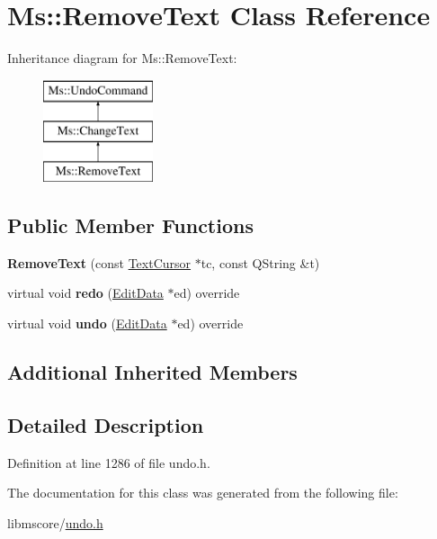 \hypertarget{class_ms_1_1_remove_text}{}\section{Ms\+:\+:Remove\+Text Class Reference}
\label{class_ms_1_1_remove_text}
Inheritance diagram for Ms\+:\+:Remove\+Text\+:\begin{figure}[H]
\begin{center}
\leavevmode
\includegraphics[height=3.000000cm]{class_ms_1_1_remove_text}
\end{center}
\end{figure}
\subsection*{Public Member Functions}
\begin{DoxyCompactItemize}
\item 
\mbox{\label{class_ms_1_1_remove_text_aac5d3a9feb380e442468cd78461e22bf}} 
{\bfseries Remove\+Text} (const \hyperlink{class_ms_1_1_text_cursor}{Text\+Cursor} $\ast$tc, const Q\+String \&t)
\item 
\mbox{\label{class_ms_1_1_remove_text_a96bb22c0aff180de8f97d9cd5cb75bbf}} 
virtual void {\bfseries redo} (\hyperlink{class_ms_1_1_edit_data}{Edit\+Data} $\ast$ed) override
\item 
\mbox{\label{class_ms_1_1_remove_text_a331671e5f575e280993b9a4011b266c6}} 
virtual void {\bfseries undo} (\hyperlink{class_ms_1_1_edit_data}{Edit\+Data} $\ast$ed) override
\end{DoxyCompactItemize}
\subsection*{Additional Inherited Members}


\subsection{Detailed Description}


Definition at line 1286 of file undo.\+h.



The documentation for this class was generated from the following file\+:\begin{DoxyCompactItemize}
\item 
libmscore/\hyperlink{undo_8h}{undo.\+h}\end{DoxyCompactItemize}
